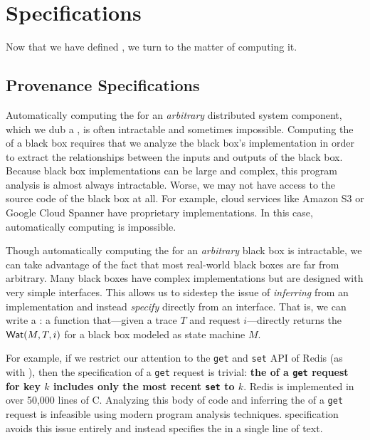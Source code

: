 \section{\WatProvenance{} Specifications}
Now that we have defined \watprovenance{}, we turn to the matter of computing it.

\subsection{Provenance Specifications}
Automatically computing the \watprovenance{} for an \emph{arbitrary}
distributed system component, which we dub a , is often
intractable and sometimes impossible. Computing the \watprovenance{} of a black
box requires that we analyze the black box's implementation in order to extract
the relationships between the inputs and outputs of the black box. Because
black box implementations can be large and complex, this program analysis is
almost always intractable. Worse, we may not have access to the source code of
the black box at all. For example, cloud services like Amazon S3 or Google
Cloud Spanner have proprietary implementations. In this case,
automatically computing \watprovenance{} is impossible.

\newcommand{\kvget}{\texttt{get}}
\newcommand{\kvset}{\texttt{set}}

Though automatically computing the \watprovenance{} for an \emph{arbitrary}
black box is intractable, we can take advantage of the fact that most
real-world black boxes are far from arbitrary. Many black boxes have complex
implementations but are designed with very simple interfaces.  This allows us
to sidestep the issue of \emph{inferring} \watprovenance{} from an
implementation and instead \emph{specify} \watprovenance{} directly from an
interface. That is, we can write a : a
function that---given a trace $T$ and request $i$---directly returns the
\watprovenance{} $\textsf{Wat}(M, T, i)$ for a black box modeled as state machine $M$.

For example, if we restrict our attention to the \kvget{} and \kvset{} API of
Redis (as with ), then the \watprovenance{}
specification of a \kvget{} request is trivial: \textbf{the \watprovenance{} of
a \kvget{} request for key $k$ includes only the most recent \kvset{} to
$k$}. Redis is implemented in over 50,000 lines of C. Analyzing this body of
code and inferring the \watprovenance{} of a \kvget{} request is infeasible
using modern program analysis techniques. \Watprovenance{} specification
avoids this issue entirely and instead specifies the \watprovenance{} in a
single line of text.

